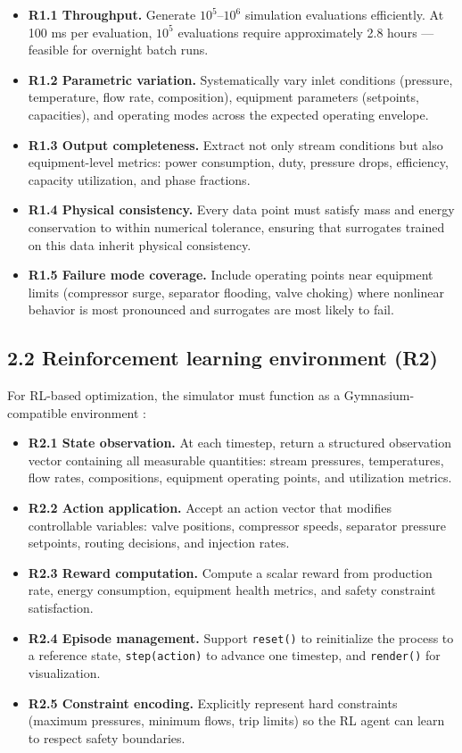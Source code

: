 \documentclass[review,3p]{custom}
\begin{document}
\begin{itemize}
  \item \textbf{R1.1 Throughput.} Generate $10^5$--$10^6$ simulation evaluations efficiently. At 100 ms per evaluation, $10^5$ evaluations require approximately 2.8 hours --- feasible for overnight batch runs.
  \item \textbf{R1.2 Parametric variation.} Systematically vary inlet conditions (pressure, temperature, flow rate, composition), equipment parameters (setpoints, capacities), and operating modes across the expected operating envelope.
  \item \textbf{R1.3 Output completeness.} Extract not only stream conditions but also equipment-level metrics: power consumption, duty, pressure drops, efficiency, capacity utilization, and phase fractions.
  \item \textbf{R1.4 Physical consistency.} Every data point must satisfy mass and energy conservation to within numerical tolerance, ensuring that surrogates trained on this data inherit physical consistency.
  \item \textbf{R1.5 Failure mode coverage.} Include operating points near equipment limits (compressor surge, separator flooding, valve choking) where nonlinear behavior is most pronounced and surrogates are most likely to fail.
\end{itemize}

\subsection{2.2 Reinforcement learning environment (R2)}

For RL-based optimization, the simulator must function as a Gymnasium-compatible environment \cite{Brockman2016, Towers2023}:

\begin{itemize}
  \item \textbf{R2.1 State observation.} At each timestep, return a structured observation vector containing all measurable quantities: stream pressures, temperatures, flow rates, compositions, equipment operating points, and utilization metrics.
  \item \textbf{R2.2 Action application.} Accept an action vector that modifies controllable variables: valve positions, compressor speeds, separator pressure setpoints, routing decisions, and injection rates.
  \item \textbf{R2.3 Reward computation.} Compute a scalar reward from production rate, energy consumption, equipment health metrics, and safety constraint satisfaction.
  \item \textbf{R2.4 Episode management.} Support \texttt{reset()} to reinitialize the process to a reference state, \texttt{step(action)} to advance one timestep, and \texttt{render()} for visualization.
  \item \textbf{R2.5 Constraint encoding.} Explicitly represent hard constraints (maximum pressures, minimum flows, trip limits) so the RL agent can learn to respect safety boundaries.
\end{itemize}
\end{document}
